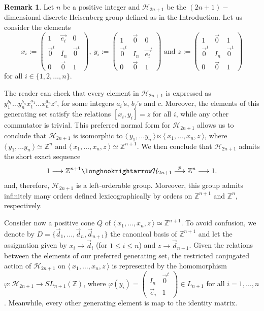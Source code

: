 \documentclass[12pt]{article}
\theoremstyle{definition}
\newtheorem{rem}{Remark}
\begin{document}
\begin{rem}
Let $n$ be a positive integer and $\mathcal{H}_{2n+1}$ be the $(2n+1)-$dimensional discrete Heisenberg group defined as in the Introduction. Let us consider the elements
$$x_i:=\left ( 
\begin{array}{ccc}
1 & \vec{e_i} & 0\\
\vec{0}^t & I_n & \vec{0}^t\\
0 & \vec{0} & 1
\end{array}
\right ), \
y_i:=\left ( 
\begin{array}{ccc}
1 & \vec{0} & 0\\
\vec{0}^t & I_n & \vec{e_i}^t\\
0 & \vec{0} & 1
\end{array}
\right ) \text{ and }
z:=
\left ( 
\begin{array}{ccc}
1 & \vec{0} & 1\\
\vec{0}^t & I_n & \vec{0}^t\\
0 & \vec{0} & 1
\end{array}
\right )
$$
for all $i\in \{1,2,\dots ,n\}$. %

The reader can check that every element in $\mathcal{H}_{2n+1}$ is expressed as $y_1^{b_1}\dots y_n^{b_n}x_1^{a_1}\dots x_n^{a_n} z^c$, for some integers $a_i$'s, $b_j$'s and $c$. 
Moreover, the elements of this generating set satisfy the relations $[x_i,y_i]=z$ for all $i$, while any other commutator is trivial. This preferred normal form for $\mathcal{H}_{2n+1}$ allows us to conclude that $\mathcal{H}_{2n+1}$ is isomorphic to $\langle\ y_1,\dots y_n\ \rangle \ltimes \langle\ x_1,\dots,x_n,z\ \rangle $, where $\langle\ y_1,\dots y_n\ \rangle\simeq \mathbb{Z}^n$ and $\langle\ x_1,\dots,x_n,z\ \rangle\simeq \mathbb{Z}^{n+1}$. We then conclude that $\mathcal{H}_{2n+1}$ admits the short exact sequence 
$$1\longrightarrow \mathbb{Z}^{n+1}\longhookrightarrow  \mathcal{H}_{2n+1}\overset{p}\longrightarrow \mathbb{Z}^n\longrightarrow 1.$$
and, therefore, $\mathcal{H}_{2n+1}$ is a left-orderable group. Moreover, this group admits infinitely many orders defined lexicographically by orders on $\mathbb{Z}^{n+1}$ and $\mathbb{Z}^n$, respectively.  

Consider now a positive cone $Q$ of $\langle\ x_1,\dots,x_n,z\ \rangle\simeq \mathbb{Z}^{n+1}$. To avoid confusion, we denote by $D=\{\vec{d}_1,\dots,\vec{d}_n,\vec{d}_{n+1}\}$ the canonical basis of $\mathbb{Z}^{n+1}$ and let the assignation given by $x_i\rightarrow \vec{d}_i$ (for $1\leq i\leq n$) and $z\rightarrow \vec{d}_{n+1}$. Given the relations between the elements of our preferred generating set, the restricted conjugated action of $\mathcal{H}_{2n+1}$ on $\langle\ x_1,\dots,x_n,z\ \rangle$ is represented by the homomorphism $\varphi:\mathcal{H}_{2n+1}\rightarrow SL_{n+1}(\mathbb{Z})$, where $\varphi(y_i)=\left (
\begin{array}{cc}
    I_{n} & \vec{0}^t \\
    \vec{e}_i & 1
\end{array}
\right )\in L_{n+1}$ for all $i=1,\dots, n$. Meanwhile, every other generating element is map to the identity matrix.


\end{rem}
\end{document}
